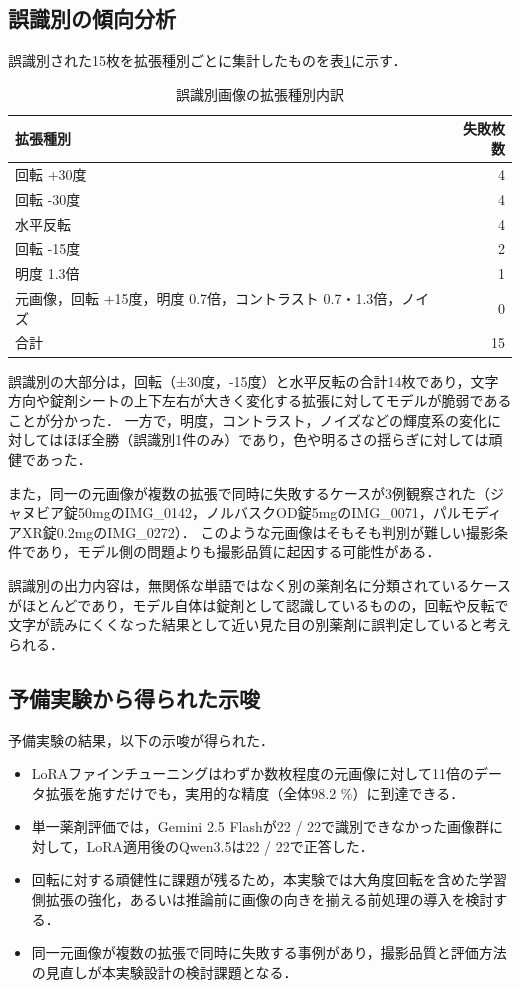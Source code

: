 \documentclass{ltjsarticle}
\begin{document}
\subsection{誤識別の傾向分析}

誤識別された15枚を拡張種別ごとに集計したものを表\ref{tab:failed_aug}に示す．

\begin{table}[h]
\centering
\caption{誤識別画像の拡張種別内訳}
\label{tab:failed_aug}
\begin{tabular}{lr}
\hline
拡張種別 & 失敗枚数 \\
\hline
回転 +30度 & 4 \\
回転 -30度 & 4 \\
水平反転 & 4 \\
回転 -15度 & 2 \\
明度 1.3倍 & 1 \\
元画像，回転 +15度，明度 0.7倍，コントラスト 0.7・1.3倍，ノイズ & 0 \\
\hline
合計 & 15 \\
\hline
\end{tabular}
\end{table}

誤識別の大部分は，回転（±30度，-15度）と水平反転の合計14枚であり，文字方向や錠剤シートの上下左右が大きく変化する拡張に対してモデルが脆弱であることが分かった．
一方で，明度，コントラスト，ノイズなどの輝度系の変化に対してはほぼ全勝（誤識別1件のみ）であり，色や明るさの揺らぎに対しては頑健であった．

また，同一の元画像が複数の拡張で同時に失敗するケースが3例観察された（ジャヌビア錠50mgのIMG\_0142，ノルバスクOD錠5mgのIMG\_0071，パルモディアXR錠0.2mgのIMG\_0272）．
このような元画像はそもそも判別が難しい撮影条件であり，モデル側の問題よりも撮影品質に起因する可能性がある．

誤識別の出力内容は，無関係な単語ではなく別の薬剤名に分類されているケースがほとんどであり，モデル自体は錠剤として認識しているものの，回転や反転で文字が読みにくくなった結果として近い見た目の別薬剤に誤判定していると考えられる．

\subsection{予備実験から得られた示唆}

予備実験の結果，以下の示唆が得られた．

\begin{itemize}
  \item LoRAファインチューニングはわずか数枚程度の元画像に対して11倍のデータ拡張を施すだけでも，実用的な精度（全体98.2 \%）に到達できる．
  \item 単一薬剤評価では，Gemini 2.5 Flashが22 / 22で識別できなかった画像群に対して，LoRA適用後のQwen3.5は22 / 22で正答した．
  \item 回転に対する頑健性に課題が残るため，本実験では大角度回転を含めた学習側拡張の強化，あるいは推論前に画像の向きを揃える前処理の導入を検討する．
  \item 同一元画像が複数の拡張で同時に失敗する事例があり，撮影品質と評価方法の見直しが本実験設計の検討課題となる．
\end{itemize}
\end{document}

